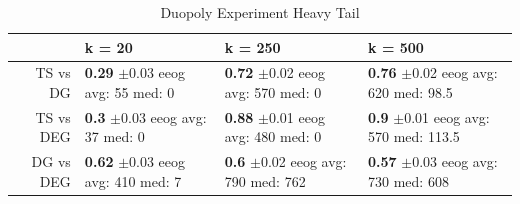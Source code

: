 \documentclass{article}
\theoremstyle{definition}
\begin{document}
\begin{table}[ht]
\centering
\caption{Duopoly Experiment Heavy Tail}
\begin{tabular}{rlll}
  \hline
 & k = 20 & k = 250 & k = 500 \\
  \hline
TS vs DG & \makecell{\textbf{0.29} $\pm$0.03\\ eeog \\ avg: 55\\ med: 0} & \makecell{\textbf{0.72} $\pm$0.02\\ eeog \\ avg: 570\\ med: 0} & \makecell{\textbf{0.76} $\pm$0.02\\ eeog \\ avg: 620\\ med: 98.5} \\
  TS vs DEG & \makecell{\textbf{0.3} $\pm$0.03\\ eeog \\ avg: 37\\ med: 0} & \makecell{\textbf{0.88} $\pm$0.01\\ eeog \\ avg: 480\\ med: 0} & \makecell{\textbf{0.9} $\pm$0.01\\ eeog \\ avg: 570\\ med: 113.5} \\
  DG vs DEG & \makecell{\textbf{0.62} $\pm$0.03\\ eeog \\ avg: 410\\ med: 7} & \makecell{\textbf{0.6} $\pm$0.02\\ eeog \\ avg: 790\\ med: 762} & \makecell{\textbf{0.57} $\pm$0.03\\ eeog \\ avg: 730\\ med: 608} \\
   \hline
\end{tabular}
\label{sim_ht}
\end{table}
\end{document}

